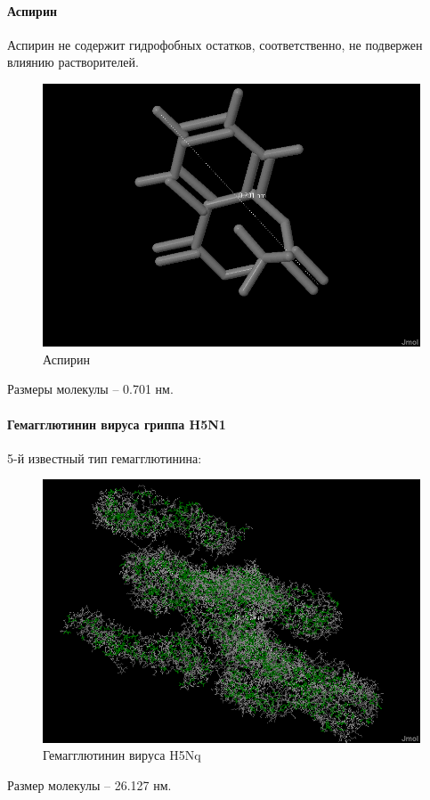 \documentclass{article}
\begin{document}
	\paragraph*{Аспирин\\}
	Аспирин не содержит гидрофобных остатков, соответственно, не подвержен влиянию растворителей.
	\begin{figure}[H]
		\centering
		\includegraphics[width=0.7\linewidth]{aspirin}
		\caption{Аспирин}
		\label{fig:aspirin}
	\end{figure}
	Размеры молекулы -- 0.701 нм.
	\paragraph*{Гемагглютинин вируса гриппа H5N1\\}
	5-й известный тип гемагглютинина:
	\begin{figure}[H]
		\centering
		\includegraphics[width=0.7\linewidth]{h5n126-127}
		\caption{Гемагглютинин вируса H5Nq}
		\label{fig:h5n126-127}
	\end{figure}
	Размер молекулы -- 26.127 нм.
\end{document}
